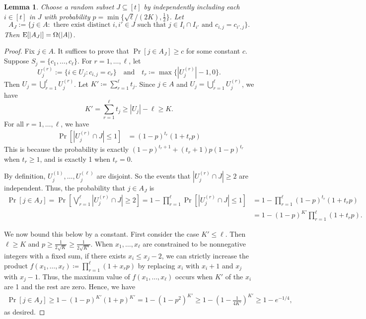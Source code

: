\documentclass[11pt]{article}
\newtheorem{lemma}[theorem]{Lemma}
\newcommand{\ex}{{\rm{E}}}
\newcommand\ind[1]{^{(#1)}}
\begin{document}
 \begin{lemma}\label{lem_sampling}
   Choose a random subset $J\subseteq [t]$ by independently including each $i\in[t]$ in $J$ with probability $p=\min\{\sqrt{\ell}/(2K),\frac{1}{2}\}$.
    Let
    \[
    A_J:=\{j\in A: \text{ there exist distinct } i, i'\in J \text{ such that } j\in I_i\cap I_{i'} \text{ and } c_{i,j}=c_{i',j}\}.
    \]
    Then $\ex[|A_J|]=\Omega(|A|)$.
 \label{}
 \end{lemma}
 \begin{proof}
  Fix $j\in A$.
  It suffices to prove that $\Pr[j\in A_J]\ge c$ for some constant $c$. Suppose $S_j=\{c_1,\dots,c_\ell\}$. For $r=1,\dots,\ell$, let
  \[
   U_j^{(r)}:=\{i\in U_j: c_{i,j}=c_r\}
   \quad\text{and}\quad t_r\coloneqq \max\{|U_j\ind{r}|-1,0\}.
   \]
   Then $U_j=\bigcup_{r=1}^\ell U_j^{(r)}$.
   Let $K'\coloneqq \sum_{r=1}^{\ell} t_j$.
   Since $j\in A$ and $U_j=\bigcup_{r=1}^\ell U_j^{(r)}$, we have
   \[
   K'=\sum_{r=1}^{\ell} t_j \ge |U_j|-\ell \ge K.
   \]
   For all $r=1,\dots,\ell$, we have
   \begin{align}
    \Pr[|U_j\ind{r}\cap J|\le 1]
    &= (1-p)^{t_r}(1+t_rp)
   \label{}
   \end{align}
   This is because the probability is exactly $(1-p)^{t_r+1} + (t_r+1)p(1-p)^{t_r}$ when $t_r\ge 1$, and is exactly 1 when $t_r=0$.

   By definition, $U_j\ind{1},\dots,U_j\ind{\ell}$ are disjoint. So the events that $|U_j\ind{r}\cap J|\ge 2$ are independent.
   Thus, the probability that $j\in A_J$ is
   \begin{align}
    \Pr[j\in A_J]
    =\Pr\left[\bigvee_{r=1}^\ell |U_j\ind{r}\cap J|\geq 2\right]
    = 1 - \prod_{r=1}^{\ell} \Pr[|U_j\ind{r}\cap J|\le 1]
    &= 1 - \prod_{r=1}^{\ell} (1-p)^{t_r}(1+t_rp)\\
    &= 1 - (1-p)^{K'}\prod_{r=1}^{\ell} (1+t_rp).
   \end{align}

   We now bound this below by a constant.
   First consider the case $K'\le \ell$.
   Then $ \ell \ge K$ and $p\ge \frac{1}{2\sqrt{K}}\ge \frac{1}{2\sqrt{K'}}$.
   When $x_1,\dots,x_\ell$ are constrained to be nonnegative integers with a fixed sum, if there exists $x_i \le x_j-2$, we can strictly increase the product $f(x_1,\dots,x_\ell)\coloneqq \prod_{r=1}^{\ell} (1+x_rp)$ by replacing $x_i$ with $x_i+1$ and $x_j$ with $x_j-1$.
   Thus, the maximum value of $f(x_1,\dots,x_\ell)$ occurs when $K'$ of the $x_i$ are 1 and the rest are zero.
   Hence, we have
   \begin{align}
    \Pr[j\in A_J]
    \ge 1 - (1-p)^{K'}(1+p)^{K'}
    = 1-(1-p^2)^{K'}
    \ge 1 - (1-\frac{1}{4K'})^{K'}
    \ge 1 - e^{-1/4},
   \end{align}
   as desired.


\end{proof}
\end{document}
